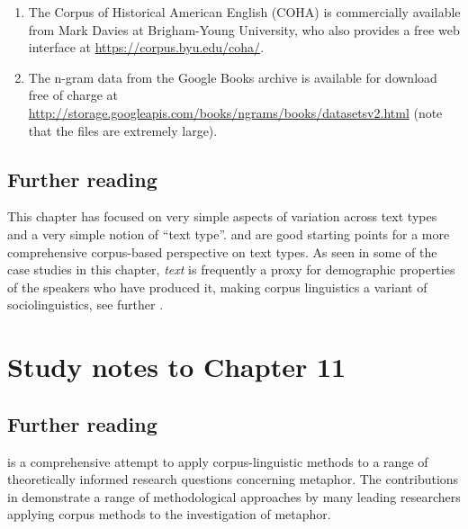 \begin{enumerate}
  \item The Corpus of Historical American English (COHA) is commercially available from Mark Davies at Brigham-Young University, who also provides a free web interface at \url{https://corpus.byu.edu/coha/}.
  \item The n-gram data from the Google Books archive is available for download free of charge at \url{http://storage.googleapis.com/books/ngrams/books/datasetsv2.html} (note that the files are extremely large).
\end{enumerate}

\subsection*{Further reading}

This chapter has focused on very simple aspects of variation across text types and a very simple notion of “text type”. \citet{biber_variation_1988} and \citet{biber_typology_1989} are good starting points for a more comprehensive corpus-based perspective on text types. As seen in some of the case studies in this chapter, \textit{text} is frequently a proxy for demographic properties of the speakers who have produced it, making corpus linguistics a variant of sociolinguistics, see further \citet{baker_sociolinguistics_2010}.

\section*{Study notes to Chapter 11}
\label{sec:studynotes11}

\subsection*{Further reading}

\citet{deignan_metaphor_2005} is a comprehensive attempt to apply corpus-linguistic methods to a range of theoretically informed research questions concerning metaphor. The contributions in \citet{stefanowitsch_corpus-based_2006} demonstrate a range of methodological approaches by many leading researchers applying corpus methods to the investigation of metaphor.


